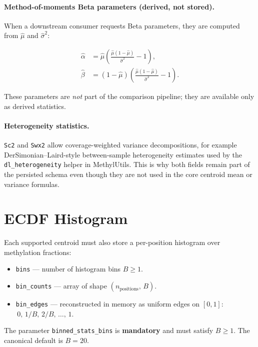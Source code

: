 \documentclass[11pt]{article}
\begin{document}
\paragraph{Method-of-moments Beta parameters (derived, not stored).}
When a downstream consumer requests Beta parameters, they are computed from
\(\hat{\mu}\) and \(\hat{\sigma}^2\):

\begin{align}
  \hat{\alpha} &= \hat{\mu}\left(
      \frac{\hat{\mu}(1-\hat{\mu})}{\hat{\sigma}^2} - 1
    \right), \\[4pt]
  \hat{\beta}  &= (1-\hat{\mu})\left(
      \frac{\hat{\mu}(1-\hat{\mu})}{\hat{\sigma}^2} - 1
    \right).
\end{align}

These parameters are \emph{not} part of the comparison pipeline; they are
available only as derived statistics.

\paragraph{Heterogeneity statistics.}
\texttt{Sc2} and \texttt{Swx2} allow coverage-weighted variance
decompositions, for example DerSimonian--Laird-style between-sample
heterogeneity estimates used by the \texttt{dl\_heterogeneity} helper in
MethylUtils.  This is why both fields remain part of the persisted schema
even though they are not used in the core centroid mean or variance formulas.

\section{ECDF Histogram}

Each supported centroid must also store a per-position histogram over
methylation fractions:

\begin{itemize}
  \item \texttt{bins} --- number of histogram bins \(B \geq 1\).
  \item \texttt{bin\_counts} --- array of shape \((n_\text{positions},\,B)\).
  \item \texttt{bin\_edges} --- reconstructed in memory as uniform edges on
        \([0,1]\): \(\,0,\,1/B,\,2/B,\,\ldots,\,1\).
\end{itemize}

The parameter \texttt{binned\_stats\_bins} is \textbf{mandatory} and must
satisfy \(B \geq 1\).  The canonical default is \(B = 20\).
\end{document}
